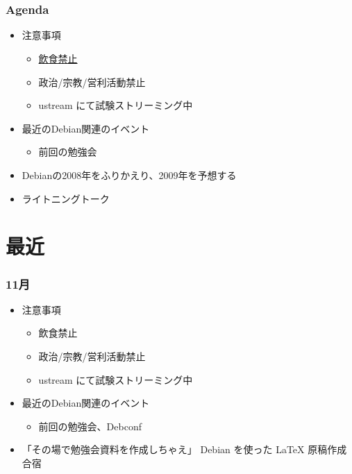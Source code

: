 \frame{\titlepage{}}


\section{}
\begin{frame}
 \frametitle{Agenda}
\begin{minipage}[t]{0.45\hsize}
  \begin{itemize}
  \item 注意事項
	\begin{itemize}
	 \item \underline{飲食禁止}
	 \item 政治/宗教/営利活動禁止
	 \item ustream にて試験ストリーミング中
	\end{itemize}
  \item 最近のDebian関連のイベント
	\begin{itemize}
	 \item 前回の勉強会
	\end{itemize}
 \end{itemize}
\end{minipage} 
\begin{minipage}[t]{0.45\hsize}
 \begin{itemize}
  \item Debianの2008年をふりかえり、2009年を予想する
  \item ライトニングトーク
 \end{itemize}
\end{minipage}
\end{frame}

\section{最近}

\begin{frame}
 \frametitle{11月}
\begin{minipage}[t]{0.45\hsize}
  \begin{itemize}
  \item 注意事項
	\begin{itemize}
	 \item 飲食禁止
	 \item 政治/宗教/営利活動禁止
	 \item ustream にて試験ストリーミング中
	\end{itemize}
  \item 最近のDebian関連のイベント
	\begin{itemize}
	 \item 前回の勉強会、Debconf
	\end{itemize}
 \end{itemize}
\end{minipage} 
\begin{minipage}[t]{0.45\hsize}
 \begin{itemize}
  \item 「その場で勉強会資料を作成しちゃえ」 Debian を使った LaTeX 原稿作成合宿
 \end{itemize}
\end{minipage}
\end{frame}


